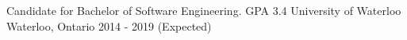 


\begin{cventries}


\cventry
{Candidate for Bachelor of Software Engineering. GPA 3.4} %
{University of Waterloo}
{Waterloo, Ontario} %
    {2014 - 2019 (Expected)} %
{ %
}


\end{cventries}
